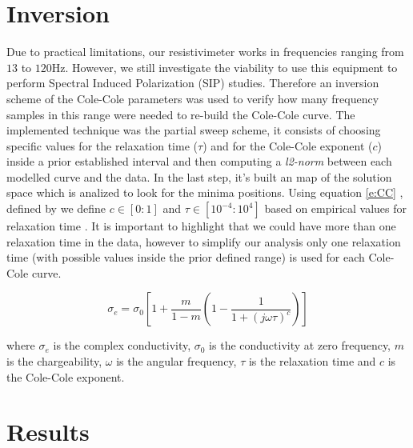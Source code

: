 \documentclass{vie16}
\begin{document}
\section{Inversion}
Due to practical limitations, our resistivimeter works in frequencies
ranging from $13$ to $120$Hz. However, we still investigate the
viability to use this equipment to perform Spectral Induced
Polarization (SIP) studies. Therefore an inversion scheme of the
Cole-Cole parameters was used to verify how many frequency samples in
this range were needed to re-build the Cole-Cole curve. The
implemented technique was the partial sweep scheme, it consists of
choosing specific values for the relaxation time ($\tau$) and for the
Cole-Cole exponent ($c$) inside a prior established interval and then
computing a \textit{l2-norm} between each modelled curve and the data.
In the last step, it's built an map of the solution space which is
analized to look for the minima positions.  Using equation \ref{e:CC}
, defined by \citet{tarasov13} we define $c \in [0:1]$ and $\tau \in
[10^{-4}:10^{4}]$ based on empirical values for relaxation time
\citet{telford90} . It is important to highlight that we could have
more than one relaxation time in the data, however to simplify our
analysis only one relaxation time (with possible values inside the
prior defined range) is used for each Cole-Cole curve.



\begin{equation}
	\sigma_{e} = \sigma_{0}
			\left[
			1 + \frac{m}{1-m}
						\left( 
								1 - \frac{1}{1+ \left( j\omega\tau \right)^{c} }	
						\right) 			
			\right]
	\label{e:CC}
\end{equation}

where $\sigma_{e}$ is the complex conductivity, $\sigma_{0}$ is the
conductivity at zero frequency, $m$ is the chargeability, $\omega$ is 
the angular frequency, $\tau$ is the relaxation time and $c$ is the 
Cole-Cole exponent.


\section{Results}



\end{document}

